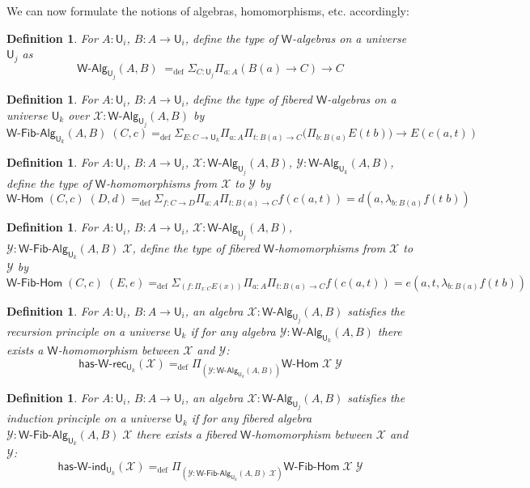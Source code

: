 \documentclass[reqno,10pt,a4paper,oneside]{amsart}
\newcommand{\X}{\mathcal{X}}
\newcommand{\Y}{\mathcal{Y}}
\newcommand{\prd}[1]{\Pi_{#1}}
\newcommand{\sm}[1]{\Sigma_{#1}}
\newcommand{\lam}[1]{\lambda_{#1}}
\newcommand{\defeq}{=_{\mathrm{def}}}
\newcommand{\W}{\mathsf{W}}
\newcommand{\UU}{\mathsf{U}}
\newcommand{\WAlg}{\mathsf{W}\text{-}\mathsf{Alg}}
\newcommand{\WFibAlg}{\mathsf{W}\text{-}\mathsf{Fib}\text{-}\mathsf{Alg}}
\newcommand{\WHom}{\mathsf{W}\text{-}\mathsf{Hom}}
\newcommand{\WFibHom}{\mathsf{W}\text{-}\mathsf{Fib}\text{-}\mathsf{Hom}}
\newcommand{\HasWRec}{\mathsf{has}\text{-}\mathsf{W}\text{-}\mathsf{rec}}
\newcommand{\HasWInd}{\mathsf{has}\text{-}\mathsf{W}\text{-}\mathsf{ind}}
\numberwithin{equation}{section}
\theoremstyle{mythm}
\theoremstyle{mydef}
\newtheorem{definition}[theorem]{Definition}
\theoremstyle{myrmk}
\begin{document}
We can now formulate the notions of algebras, homomorphisms, etc. accordingly:

\begin{definition}\label{def:WAlg}
For $A:\UU_i$, $B : A \to \UU_i$, define the type of \emph{$\W$-algebras} on a universe $\UU_j$ as
\[\WAlg_{\UU_j}(A,B) \; \defeq \sm{C : \UU_j} \prd{a:A} (B(a) \to C) \to C \]
\end{definition}

\begin{definition}\label{def:WFibAlg}
For $A:\UU_i$, $B : A \to \UU_i$, define the type of \emph{fibered $\W$-algebras} on a universe $\UU_k$ over $\mathcal{X} : \WAlg_{\UU_j}(A,B)$ by
\[\WFibAlg_{\UU_k}(A,B) \; (C,c) \defeq \sm{E : C \to \UU_k} \prd{a:A}\prd{t: B(a) \to C} \big(\prd{b:B(a)} E(t \;b) \big) \to E(c(a,t)) \]
\end{definition}

\begin{definition}\label{def:WHom}
For $A:\UU_i$, $B : A \to \UU_i$, $\X : \WAlg_{\UU_j}(A,B)$, $\Y : \WAlg_{\UU_k}(A,B)$, define the type of \emph{$\W$-homomorphisms} from $\X$ to $\Y$ by
\[ \WHom \; (C,c) \; (D,d) \defeq \sm{f:C\to D}\prd{a:A}\prd{t: B(a) \to C} f(c(a,t)) = d(a,\lam{b:B(a)} f(t\;b)) \]
\end{definition}

\begin{definition}\label{def:WFibHom}
For $A:\UU_i$, $B : A \to \UU_i$, $\X : \WAlg_{\UU_j}(A,B)$, $\Y : \WFibAlg_{\UU_k}(A,B) \; \X$, define the type of \emph{fibered $\W$-homomorphisms} from $\X$ to $\Y$ by
\[ \WFibHom \; (C,c) \; (E,e) \defeq \sm{(f:\prd{x:C}E(x))}\prd{a:A}\prd{t: B(a) \to C} f(c(a,t)) = e(a,t,\lam{b:B(a)} f(t\;b)) \]
\end{definition}

\begin{definition}\label{def:WRec}
For $A:\UU_i$, $B : A \to \UU_i$, an algebra $\X : \WAlg_{\UU_j}(A,B)$ \emph{satisfies the recursion principle} on a universe $\UU_k$ if for any algebra $\Y : \WAlg_{\UU_k}(A,B)$ there exists
a $\W$-homomorphism between $\X$ and $\Y$:
\[ \HasWRec_{\UU_k}(\X) \defeq \prd{(\Y:\WAlg_{\UU_k}(A,B))} \WHom \; \X \; \Y \]
\end{definition}

\begin{definition}\label{def:WInd}
For $A:\UU_i$, $B : A \to \UU_i$, an algebra $\X : \WAlg_{\UU_j}(A,B)$ \emph{satisfies the induction principle} on a universe $\UU_k$ if for any fibered algebra $\Y : \WFibAlg_{\UU_k}(A,B) \; \X$ there exists a fibered $\W$-homomorphism between $\X$ and $\Y$:
\[ \HasWInd_{\UU_k}(\X) \defeq \prd{(\Y:\WFibAlg_{\UU_k}(A,B) \; \X)} \WFibHom \; \X \; \Y \]
\end{definition}
\end{document}
